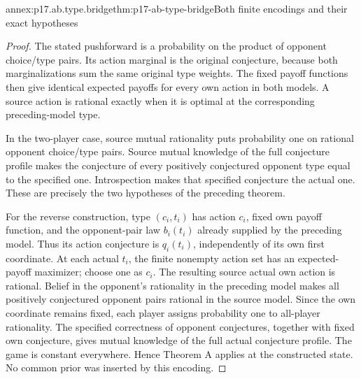 \begin{annexitem}{annex:p17.ab.type.bridge}{thm:p17-ab-type-bridge}{Both finite encodings and their exact hypotheses}
\begin{proof}
The stated pushforward is a probability on the product of opponent
choice/type pairs. Its action marginal is the original conjecture,
because both marginalizations sum the same original type weights.
The fixed payoff functions then give identical expected payoffs
for every own action in both models. A source action is rational
exactly when it is optimal at the corresponding preceding-model type.

In the two-player case, source mutual rationality puts probability
one on rational opponent choice/type pairs. Source mutual knowledge
of the full conjecture profile makes the conjecture of every
positively conjectured opponent type equal to the specified one.
Introspection makes that specified conjecture the actual one.
These are precisely the two hypotheses of the preceding theorem.

For the reverse construction, type \((c_i,t_i)\) has action \(c_i\),
fixed own payoff function, and the opponent-pair law \(b_i(t_i)\)
already supplied by the preceding model. Thus its action conjecture
is \(q_i(t_i)\), independently of its own first coordinate.
At each actual \(t_i\), the finite nonempty action set has an
expected-payoff maximizer; choose one as \(c_i\).
The resulting source actual own action is rational.
Belief in the opponent's rationality in the preceding model makes
all positively conjectured opponent pairs rational in the source
model. Since the own coordinate remains fixed, each player assigns
probability one to all-player rationality. The specified correctness
of opponent conjectures, together with fixed own conjecture, gives
mutual knowledge of the full actual conjecture profile.
The game is constant everywhere. Hence Theorem A applies at the
constructed state. No common prior was inserted by this encoding.
\end{proof}
\end{annexitem}

